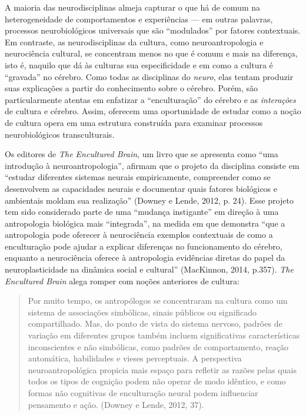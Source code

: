 A maioria das neurodisciplinas almeja capturar o que há de comum na
heterogeneidade de comportamentos e experiências --- em outras palavras,
processos neurobiológicos universais que são ``modulados'' por fatores
contextuais. Em contraste, as neurodisciplinas da cultura, como
neuroantropologia e neurociência cultural, se concentram menos no que é
comum e mais na diferença, isto é, naquilo que dá às culturas sua
especificidade e em como a cultura é ``gravada'' no cérebro. Como todas
as disciplinas do \emph{neuro}, elas tentam produzir suas explicações a
partir do conhecimento sobre o cérebro. Porém, são particularmente
atentas em enfatizar a ``enculturação'' do cérebro e as
\emph{interações} de cultura e cérebro. Assim, oferecem uma oportunidade
de estudar como a noção de cultura opera em uma estrutura construída
para examinar processos neurobiológicos transculturais.

Os editores de \emph{The Encultured Brain}, um livro que se apresenta
como ``uma introdução à neuroantropologia'', afirmam que o projeto da
disciplina consiste em ``estudar diferentes sistemas neurais
empiricamente, compreender como se desenvolvem as capacidades neurais e
documentar quais fatores biológicos e ambientais moldam sua realização''
(Downey e Lende, 2012, p. 24). Esse projeto tem sido considerado parte
de uma ``mudança instigante'' em direção à uma antropologia biológica
mais ``integrada'', na medida em que demonstra ``que a antropologia pode
oferecer à neurociência exemplos contextuais de como a enculturação pode
ajudar a explicar diferenças no funcionamento do cérebro, enquanto a
neurociência oferece à antropologia evidências diretas do papel da
neuroplasticidade na dinâmica social e cultural'' (MacKinnon, 2014,
p.357). \emph{The Encultured Brain} alega romper com noções anteriores
de cultura:

\begin{quote}
Por muito tempo, os antropólogos se concentraram na cultura como um
sistema de associações simbólicas, sinais públicos ou significado
compartilhado. Mas, do ponto de vista do sistema nervoso, padrões de
variação em diferentes grupos também incluem significativas
características inconscientes e não simbólicas, como padrões de
comportamento, reação automática, habilidades e vieses perceptuais. A
perspectiva neuroantropológica propicia mais espaço para refletir as
razões pelas quais todos os tipos de cognição podem não operar de modo
idêntico, e como formas não cognitivas de enculturação neural podem
influenciar pensamento e ação. (Downey e Lende, 2012, 37).
\end{quote}

